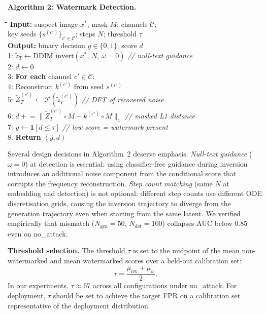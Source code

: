 \documentclass[10pt,twocolumn]{article}
\begin{document}
\medskip\noindent\textbf{Algorithm 2: Watermark Detection.}
\begin{small}
\begin{tabbing}
\quad\=\quad\=\quad\=\quad\=\kill
\textbf{Input:} suspect image $x^*$; mask $M$; channels $\mathcal{C}$; \\
\> key seeds $\{s^{(c')}\}_{c'\in\mathcal{C}}$; steps $N$; threshold $\tau$\\
\textbf{Output:} binary decision $\hat{y} \in \{0,1\}$; score $d$\\[4pt]
1:\> $\tilde{z}_T \leftarrow \mathrm{DDIM\_invert}(x^*,\, N,\, \omega{=}0)$
        \hfill\textit{// null-text guidance}\\
2:\> $d \leftarrow 0$\\
3:\> \textbf{For each} channel $c' \in \mathcal{C}$:\\
4:\>\> Reconstruct $k^{(c')}$ from seed $s^{(c')}$\\
5:\>\> $\tilde{Z}_T^{(c')} \leftarrow \mathcal{F}(\tilde{z}_T^{(c')})$
        \hfill\textit{// DFT of recovered noise}\\
6:\>\> $d \mathrel{+}= \|\tilde{Z}_T^{(c')} \circ M - k^{(c')} \circ M\|_1$
        \hfill\textit{// masked L1 distance}\\
7:\> $\hat{y} \leftarrow \mathbf{1}[d \le \tau]$
        \hfill\textit{// low score = watermark present}\\
8:\> \textbf{Return} $(\hat{y}, d)$
\end{tabbing}
\end{small}

Several design decisions in Algorithm~2 deserve emphasis.
\emph{Null-text guidance} ($\omega{=}0$) at detection is essential:
using classifier-free guidance during inversion introduces an additional
noise component from the conditional score that corrupts the frequency
reconstruction.
\emph{Step count matching} (same $N$ at embedding and detection) is not
optional: different step counts use different ODE discretisation grids,
causing the inversion trajectory to diverge from the generation trajectory
even when starting from the same latent.
We verified empirically that mismatch ($N_{\text{gen}}{=}50$,
$N_{\text{det}}{=}100$) collapses AUC below 0.85 even on no\_attack.

\textbf{Threshold selection.}
The threshold $\tau$ is set to the midpoint of the mean non-watermarked
and mean watermarked scores over a held-out calibration set:
\begin{equation}
  \tau = \frac{\mu_{\mathrm{nw}} + \mu_w}{2}.
\end{equation}
In our experiments, $\tau \approx 67$ across all configurations under
no\_attack.
For deployment, $\tau$ should be set to achieve the target FPR
on a calibration set representative of the deployment distribution.
\end{document}
